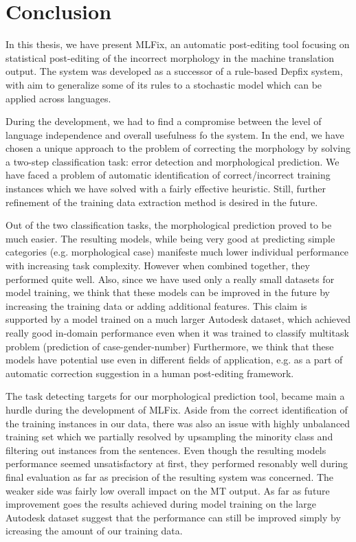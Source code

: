 \chapter{Conclusion}

In this thesis, we have present MLFix, an automatic post-editing tool focusing on statistical
post-editing of the incorrect morphology in the machine translation output. The system was
developed as a successor of a rule-based Depfix system, with aim to generalize some of its
rules to a stochastic model which can be applied across languages.

During the development, we had to find a compromise between the level of language independence
and overall usefulness fo the system. In the end, we have chosen a unique approach to the problem of correcting
the morphology by solving a two-step classification task: error detection and morphological prediction.
We have faced a problem of automatic identification of correct/incorrect training instances
which we have solved with a fairly effective heuristic. Still, further refinement of the
training data extraction method is desired in the future.

Out of the two classification tasks, the morphological prediction proved to be much easier.
The resulting models, while being very good at predicting simple categories (e.g. morphological case)
manifeste much lower individual performance with increasing task complexity. However when
combined together, they performed quite well.
Also, since we have used only a really small datasets for model training, we think that these models
can be improved in the future by increasing the training data or adding additional features.
This claim is supported by a model trained on a much larger Autodesk dataset, which achieved really good
in-domain performance even when it was trained to classify multitask problem (prediction of case-gender-number)
Furthermore, we think that
these models have potential use even in different fields of application, e.g. as a part of automatic
correction suggestion in a human post-editing framework.

The task detecting targets for our morphological prediction tool, became main a hurdle
during the development of MLFix. Aside from the correct identification of the training instances
in our data, there was also an issue with highly unbalanced training set which we partially resolved
by upsampling the minority class and filtering out instances from the  sentences.
Even though the resulting models performance seemed unsatisfactory at first, they performed resonably
well during final evaluation as far as precision of the resulting system was concerned. The weaker
side was fairly low overall impact on the MT output. As far as future improvement goes the results
achieved during model training on the large Autodesk dataset suggest that the performance can still be
improved simply by icreasing the amount of our training data.

